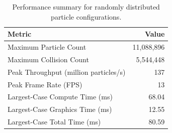 \begin{table}[ht]
\caption{Performance summary for randomly distributed particle configurations.}
\label{tab:performance_summary}
\centering
\begin{tabular}{lr}
\toprule
\textbf{Metric} & \textbf{Value}\\
\midrule
Maximum Particle Count & 11,088,896 \\ 
Maximum Collision Count & 5,544,448 \\ 
Peak Throughput (million particles/s) & 137 \\ 
Peak Frame Rate (FPS) & 13 \\ 
Largest-Case Compute Time (ms) & 68.04 \\ 
Largest-Case Graphics Time (ms) & 12.55 \\ 
Largest-Case Total Time (ms) & 80.59 \\ 
\bottomrule
\end{tabular}
\end{table}
